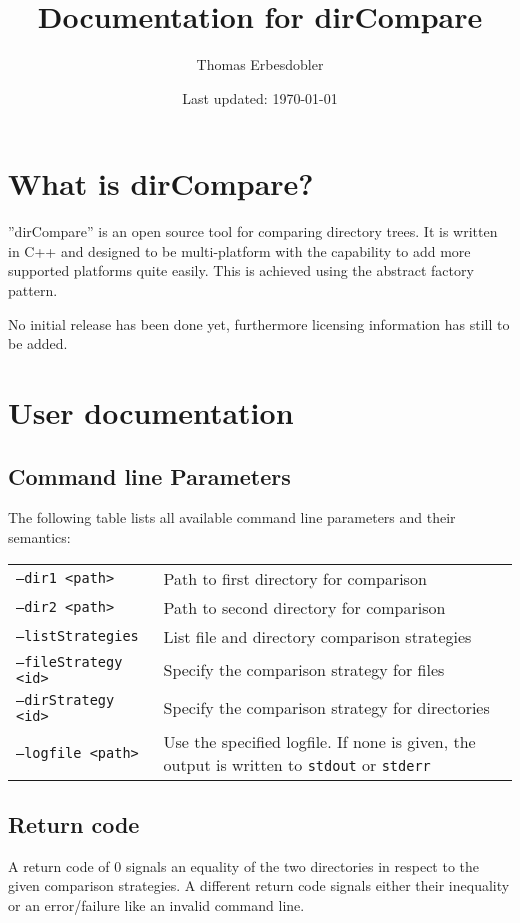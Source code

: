 \documentclass[a4paper]{article}
\title{Documentation for dirCompare}
\author{Thomas Erbesdobler}
\date{Last updated: \today}
\begin{document}
	\maketitle
	\tableofcontents
	
	\section{What is dirCompare?}
	\label{sec:what_is_dircompare}
	
	''dirCompare'' is an open source tool for comparing directory trees. It is written in C++ and designed to be multi-platform with the capability to add more supported platforms quite easily. This is achieved using the abstract factory pattern.
	
	No initial release has been done yet, furthermore licensing information has still to be added.
	
	\section{User documentation}
	\label{sec:user_documentation}
	
	\subsection{Command line Parameters}
	\label{subsec:command_line_parameters}
	
	The following table lists all available command line parameters and their semantics:
	
	\noindent
	\begin{tabularx}{\linewidth}{l|X}
		\texttt{--dir1 \textless path\textgreater} & Path to first directory for comparison \\
		\texttt{--dir2 \textless path\textgreater} & Path to second directory for comparison \\
		\texttt{--listStrategies} & List file and directory comparison strategies \\
		\texttt{--fileStrategy \textless id\textgreater} & Specify the comparison strategy for files \\
		\texttt{--dirStrategy \textless id\textgreater} & Specify the comparison strategy for directories \\
		\texttt{--logfile \textless path\textgreater} & Use the specified logfile. If none is given, the output is written to \texttt{stdout} or \texttt{stderr} \\
	\end{tabularx}
	
	\subsection{Return code}
	\label{subsec:return_code}
	
	A return code of 0 signals an equality of the two directories in respect to the given comparison strategies. A different return code signals either their inequality or an error/failure like an invalid command line.
	
\end{document}
